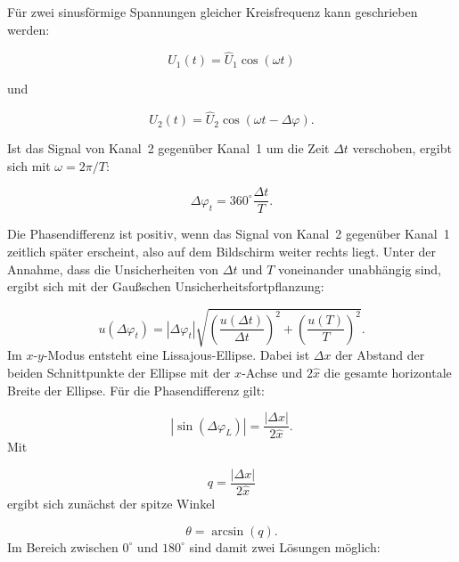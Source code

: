 \documentclass{report}
\begin{document}
Für zwei sinusförmige Spannungen gleicher Kreisfrequenz kann geschrieben werden:

\begin{equation}
U_1(t)=\hat{U}_1\cos(\omega t)
\end{equation}

\noindent
und

\begin{equation}
U_2(t)=\hat{U}_2\cos(\omega t-\Delta\varphi).
\end{equation}

\noindent
Ist das Signal von Kanal~2 gegenüber Kanal~1 um die Zeit $\Delta t$ verschoben, ergibt sich mit $\omega=2\pi/T$:

\begin{equation}
\boxed{\Delta\varphi_t=360^\circ\frac{\Delta t}{T}}.
\label{eq:phase_ty}
\end{equation}

\noindent
Die Phasendifferenz ist positiv, wenn das Signal von Kanal~2 gegenüber Kanal~1 zeitlich später erscheint, also auf dem Bildschirm weiter rechts liegt.
\noindent
Unter der Annahme, dass die Unsicherheiten von $\Delta t$ und $T$ voneinander unabhängig sind, ergibt sich mit der Gaußschen Unsicherheitsfortpflanzung:

\begin{equation}
\boxed{
u(\Delta\varphi_t)
=
|\Delta\varphi_t|
\sqrt{
\left(\frac{u(\Delta t)}{\Delta t}\right)^2
+
\left(\frac{u(T)}{T}\right)^2
}
}.
\label{eq:phase_ty_uncertainty}
\end{equation}
\noindent
Im $x$-$y$-Modus entsteht eine Lissajous-Ellipse. Dabei ist $\Delta x$ der Abstand der beiden Schnittpunkte der Ellipse mit der $x$-Achse und $2\hat{x}$ die gesamte horizontale Breite der Ellipse. Für die Phasendifferenz gilt:

\begin{equation}
\boxed{
|\sin(\Delta\varphi_L)|
=
\frac{|\Delta x|}{2\hat{x}}
}.
\label{eq:lissajous}
\end{equation}
\noindent
Mit

\begin{equation}
q=\frac{|\Delta x|}{2\hat{x}}
\end{equation}
\noindent
ergibt sich zunächst der spitze Winkel

\begin{equation}
\theta=\arcsin(q).
\end{equation}
\noindent
Im Bereich zwischen $0^\circ$ und $180^\circ$ sind damit zwei Lösungen möglich:
\end{document}
